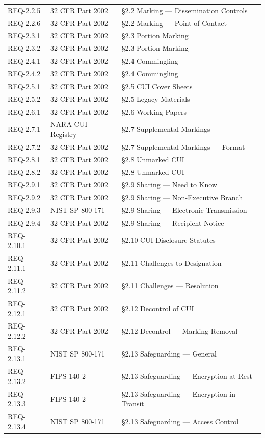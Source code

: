 \documentclass[11pt,letterpaper]{article}
\begin{document}
\begin{longtable}{@{}l l p{8cm}@{}}
REQ-2.2.5 & 32 CFR Part 2002 & \S2.2 Marking --- Dissemination Controls \\
REQ-2.2.6 & 32 CFR Part 2002 & \S2.2 Marking --- Point of Contact \\
REQ-2.3.1 & 32 CFR Part 2002 & \S2.3 Portion Marking \\
REQ-2.3.2 & 32 CFR Part 2002 & \S2.3 Portion Marking \\
REQ-2.4.1 & 32 CFR Part 2002 & \S2.4 Commingling \\
REQ-2.4.2 & 32 CFR Part 2002 & \S2.4 Commingling \\
REQ-2.5.1 & 32 CFR Part 2002 & \S2.5 CUI Cover Sheets \\
REQ-2.5.2 & 32 CFR Part 2002 & \S2.5 Legacy Materials \\
REQ-2.6.1 & 32 CFR Part 2002 & \S2.6 Working Papers \\
REQ-2.7.1 & NARA CUI Registry & \S2.7 Supplemental Markings \\
REQ-2.7.2 & 32 CFR Part 2002 & \S2.7 Supplemental Markings --- Format \\
REQ-2.8.1 & 32 CFR Part 2002 & \S2.8 Unmarked CUI \\
REQ-2.8.2 & 32 CFR Part 2002 & \S2.8 Unmarked CUI \\
REQ-2.9.1 & 32 CFR Part 2002 & \S2.9 Sharing --- Need to Know \\
REQ-2.9.2 & 32 CFR Part 2002 & \S2.9 Sharing --- Non-Executive Branch \\
REQ-2.9.3 & NIST SP 800-171 & \S2.9 Sharing --- Electronic Transmission \\
REQ-2.9.4 & 32 CFR Part 2002 & \S2.9 Sharing --- Recipient Notice \\
REQ-2.10.1 & 32 CFR Part 2002 & \S2.10 CUI Disclosure Statutes \\
REQ-2.11.1 & 32 CFR Part 2002 & \S2.11 Challenges to Designation \\
REQ-2.11.2 & 32 CFR Part 2002 & \S2.11 Challenges --- Resolution \\
REQ-2.12.1 & 32 CFR Part 2002 & \S2.12 Decontrol of CUI \\
REQ-2.12.2 & 32 CFR Part 2002 & \S2.12 Decontrol --- Marking Removal \\
REQ-2.13.1 & NIST SP 800-171 & \S2.13 Safeguarding --- General \\
REQ-2.13.2 & FIPS 140 2 & \S2.13 Safeguarding --- Encryption at Rest \\
REQ-2.13.3 & FIPS 140 2 & \S2.13 Safeguarding --- Encryption in Transit \\
REQ-2.13.4 & NIST SP 800-171 & \S2.13 Safeguarding --- Access Control \\

\end{longtable}
\end{document}
